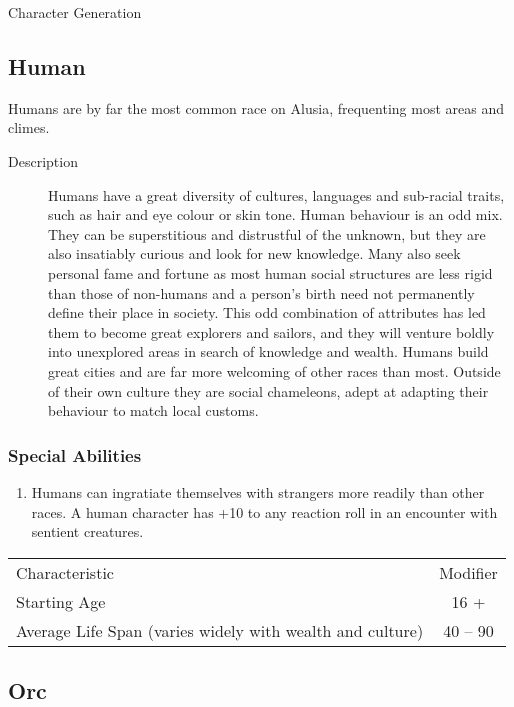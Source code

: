 \begin{Chapter}{Character Generation}
\subsection{Human}

Humans are by far the most common race on Alusia, frequenting most
areas and climes.

\begin{description}
\item[Description] Humans have a great diversity of cultures,
  languages and sub-racial traits, such as hair and eye colour or skin
  tone.  Human behaviour is an odd mix.  They can be superstitious and
  distrustful of the unknown, but they are also insatiably curious and
  look for new knowledge.  Many also seek personal fame and fortune as
  most human social structures are less rigid than those of non-humans
  and a person’s birth need not permanently define their place in
  society.  This odd combination of attributes has led them to become
  great explorers and sailors, and they will venture boldly into
  unexplored areas in search of knowledge and wealth.  Humans build
  great cities and are far more welcoming of other races than most.
  Outside of their own culture they are social chameleons, adept at
  adapting their behaviour to match local customs.
\end{description}

\subsubsection{Special Abilities}

\begin{enumerate}

\item Humans can ingratiate themselves with strangers more readily
  than other races.  A human character has +10 to any reaction roll in
  an encounter with sentient creatures.

\end{enumerate}

\begin{tabularx}{\columnwidth}{Xc}
Characteristic				& Modifier \\
Starting Age				& 16 + \\
Average Life Span (varies widely with wealth and culture) & 40 -- 90 \\
\end{tabularx}

\subsection{Orc}


\end{Chapter}
